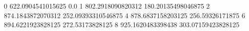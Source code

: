 0 622.0904541015625 0.0
1 802.2918090820312 180.20135498046875
2 874.1843872070312 252.09393310546875
4 878.6837158203125 256.59326171875
6 894.6221923828125 272.53173828125
8 925.1620483398438 303.07159423828125
